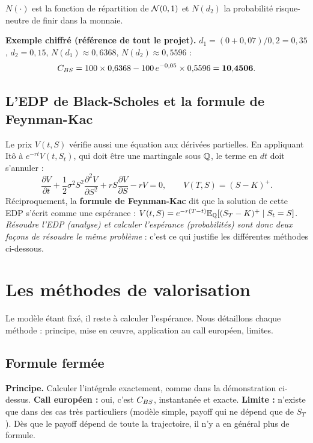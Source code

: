 $N(\cdot)$ est la fonction de répartition de $\mathcal{N}(0,1)$ et $N(d_2)$ la probabilité risque-neutre de finir dans la monnaie.

\textbf{Exemple chiffré (référence de tout le projet).} $d_1 = (0 + 0{,}07)/0{,}2 = 0{,}35$, $d_2 = 0{,}15$, $N(d_1)\approx 0{,}6368$, $N(d_2)\approx0{,}5596$ :
\[
C_{BS} = 100\times0{,}6368 - 100\,e^{-0{,}05}\times0{,}5596 = \mathbf{10{,}4506}.
\]


\subsection{L'EDP de Black-Scholes et la formule de Feynman-Kac}
Le prix $V(t,S)$ vérifie aussi une équation aux dérivées partielles. En appliquant Itô à $e^{-rt}V(t,S_t)$, qui doit être une martingale sous $\mathbb{Q}$, le terme en $dt$ doit s'annuler :
\[
\frac{\partial V}{\partial t} + \frac12\sigma^2S^2\frac{\partial^2V}{\partial S^2} + rS\frac{\partial V}{\partial S} - rV = 0,\qquad V(T,S) = (S-K)^+.
\]
Réciproquement, la \textbf{formule de Feynman-Kac} dit que la solution de cette EDP s'écrit comme une espérance :
$V(t,S) = e^{-r(T-t)}\mathbb{E}_{\mathbb{Q}}[(S_T-K)^+\mid S_t = S]$.
\emph{Résoudre l'EDP (analyse) et calculer l'espérance (probabilités) sont donc deux façons de résoudre le même problème} : c'est ce qui justifie les différentes méthodes ci-dessous.

\section{Les méthodes de valorisation}

Le modèle étant fixé, il reste à calculer l'espérance. Nous détaillons chaque méthode : principe, mise en œuvre, application au call européen, limites.

\subsection{Formule fermée}
\textbf{Principe.} Calculer l'intégrale exactement, comme dans la démonstration ci-dessus.
\textbf{Call européen :} oui, c'est $C_{BS}$, instantanée et exacte.
\textbf{Limite :} n'existe que dans des cas très particuliers (modèle simple, payoff qui ne dépend que de $S_T$). Dès que le payoff dépend de toute la trajectoire, il n'y a en général plus de formule.

